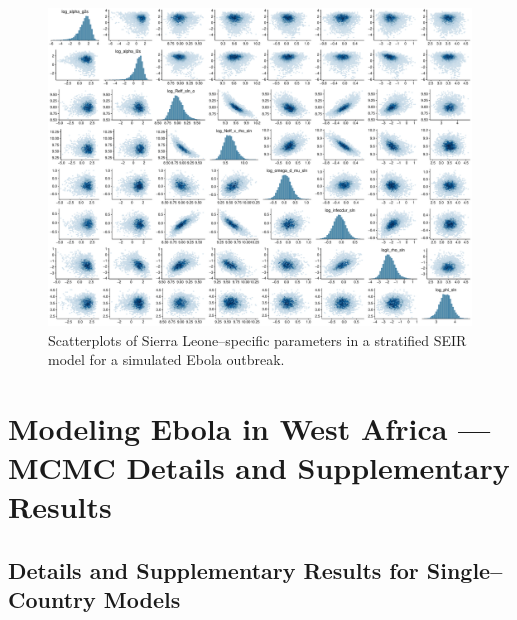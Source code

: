 \begin{figure}[htbp]
	\centering
	\includegraphics[width=\linewidth]{figures/ebola_synth_pairs_sln}
	\caption{Scatterplots of Sierra Leone--specific parameters in a stratified SEIR model for a simulated Ebola outbreak.}
\end{figure}

\section{Modeling Ebola in West Africa --- MCMC Details and Supplementary Results}
\label{sec:ebola_supplement}

\subsection{Details and Supplementary Results for Single--Country Models}
\label{subsec:ebola_single_country_supplement}

